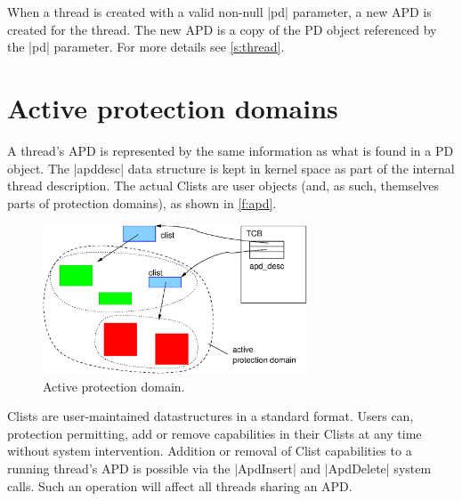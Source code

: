 \documentclass[a4paper,11pt,twoside,dvips]{report}
\begin{document}
When a thread is created with a valid non-null |pd| parameter, a new APD
is created for the thread. The new APD is a copy of the PD object
referenced by the |pd| parameter. For more details see
\autoref{s:thread}.


\section{\label{s:apd}Active protection domains}

A thread's APD is represented by the same information as what is found
in a PD object. The |apddesc| data structure is kept in kernel space as
part of the internal thread description. The actual Clists are user
objects (and, as such, themselves parts of protection domains), as shown
in \autoref{f:apd}.

\begin{figure}[htb]
\begin{center}
\includegraphics[width=0.7\textwidth]{APD}
\caption{\label{f:apd}Active protection domain.}
\end{center}
\end{figure}

Clists are user-maintained datastructures in a standard format. Users
can, protection permitting, add or remove capabilities in their Clists
at any time without system intervention. Addition or
removal of Clist capabilities to a running thread's APD is possible via
the |ApdInsert| and |ApdDelete| system calls. Such an operation will
affect all threads sharing an APD.
\end{document}
